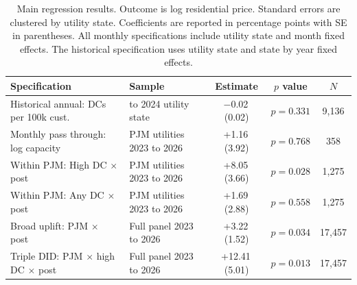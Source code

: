 \begin{table}[H]
\centering
\caption{Main regression results. Outcome is log residential price. Standard errors are clustered by utility state. Coefficients are reported in percentage points with SE in parentheses. All monthly specifications include utility state and month fixed effects. The historical specification uses utility state and state by year fixed effects.}
\label{tab:mainregs}
\scriptsize
\setlength{\tabcolsep}{4pt}
\begin{tabular}{>{\raggedright\arraybackslash}p{6.1cm} >{\raggedright\arraybackslash}p{4.2cm} c c c}
\toprule
Specification & Sample & Estimate & $p$ value & $N$ \\
\midrule
Historical annual: DCs per 100k cust. & 2010 to 2024 utility state & $-$0.02\,(0.02) & $p=0.331$ & 9,136 \\
Monthly pass through: log capacity & PJM utilities 2023 to 2026 & +1.16\,(3.92) & $p=0.768$ & 358 \\
Within PJM: High DC \(\times\) post & PJM utilities 2023 to 2026 & +8.05\,(3.66) & $p=0.028$ & 1,275 \\
Within PJM: Any DC \(\times\) post & PJM utilities 2023 to 2026 & +1.69\,(2.88) & $p=0.558$ & 1,275 \\
Broad uplift: PJM \(\times\) post & Full panel 2023 to 2026 & +3.22\,(1.52) & $p=0.034$ & 17,457 \\
Triple DID: PJM \(\times\) high DC \(\times\) post & Full panel 2023 to 2026 & +12.41\,(5.01) & $p=0.013$ & 17,457 \\
\bottomrule
\end{tabular}
\end{table}
